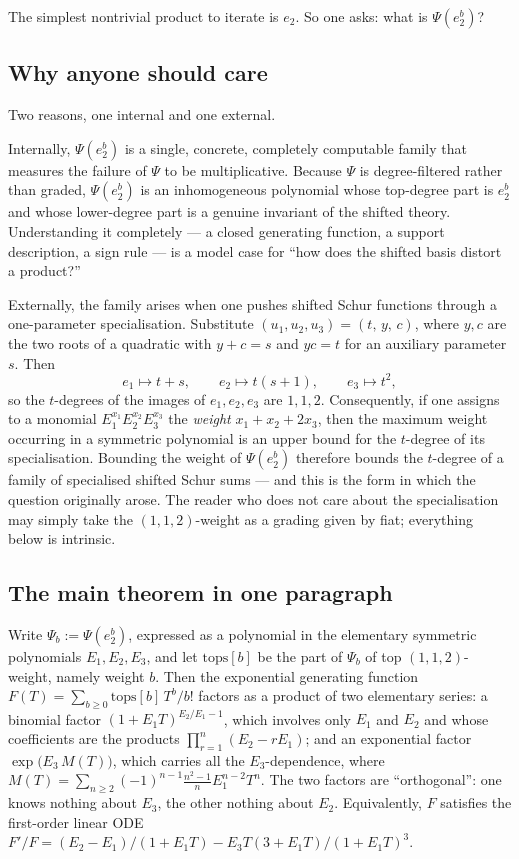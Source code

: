 \documentclass[10pt]{article}
\theoremstyle{plain}
\theoremstyle{definition}
\begin{document}
The simplest nontrivial product to iterate is $e_2$. So one asks: what is $\Psi(e_2^b)$?

\subsection*{Why anyone should care}

Two reasons, one internal and one external.

Internally, $\Psi(e_2^b)$ is a single, concrete, completely computable family that measures
the failure of $\Psi$ to be multiplicative. Because $\Psi$ is degree-filtered rather than
graded, $\Psi(e_2^b)$ is an inhomogeneous polynomial whose top-degree part is $e_2^b$ and
whose lower-degree part is a genuine invariant of the shifted theory. Understanding it
completely --- a closed generating function, a support description, a sign rule --- is a
model case for ``how does the shifted basis distort a product?''

Externally, the family arises when one pushes shifted Schur functions through a
one-parameter specialisation. Substitute $(u_1,u_2,u_3)=(t,\,y,\,c)$, where $y,c$ are the two
roots of a quadratic with $y+c=s$ and $yc=t$ for an auxiliary parameter $s$. Then
\[
 e_1\mapsto t+s,\qquad e_2\mapsto t(s+1),\qquad e_3\mapsto t^2 ,
\]
so the $t$-degrees of the images of $e_1,e_2,e_3$ are $1,1,2$. Consequently, if one assigns
to a monomial $E_1^{x_1}E_2^{x_2}E_3^{x_3}$ the \emph{weight} $x_1+x_2+2x_3$, then the
maximum weight occurring in a symmetric polynomial is an upper bound for the $t$-degree of its
specialisation. Bounding the weight of $\Psi(e_2^b)$ therefore bounds the $t$-degree of a
family of specialised shifted Schur sums --- and this is the form in which the question
originally arose. The reader who does not care about the specialisation may simply take the
$(1,1,2)$-weight as a grading given by fiat; everything below is intrinsic.

\subsection*{The main theorem in one paragraph}

Write $\Psi_b := \Psi(e_2^b)$, expressed as a polynomial in the elementary symmetric
polynomials $E_1,E_2,E_3$, and let $\mathrm{tops}[b]$ be the part of $\Psi_b$ of top
$(1,1,2)$-weight, namely weight $b$. Then the exponential generating function
$F(T)=\sum_{b\ge0}\mathrm{tops}[b]\,T^b/b!$ factors as a product of two elementary series: a
binomial factor $(1+E_1T)^{E_2/E_1-1}$, which involves only $E_1$ and $E_2$ and whose
coefficients are the products $\prod_{r=1}^{n}(E_2-rE_1)$; and an exponential factor
$\exp\!\big(E_3\,M(T)\big)$, which carries all the $E_3$-dependence, where
$M(T)=\sum_{n\ge2}(-1)^{n-1}\tfrac{n^2-1}{n}E_1^{n-2}T^n$. The two factors are ``orthogonal'':
one knows nothing about $E_3$, the other nothing about $E_2$. Equivalently, $F$ satisfies the
first-order linear ODE $F'/F=(E_2-E_1)/(1+E_1T)-E_3T(3+E_1T)/(1+E_1T)^3$.
\end{document}

